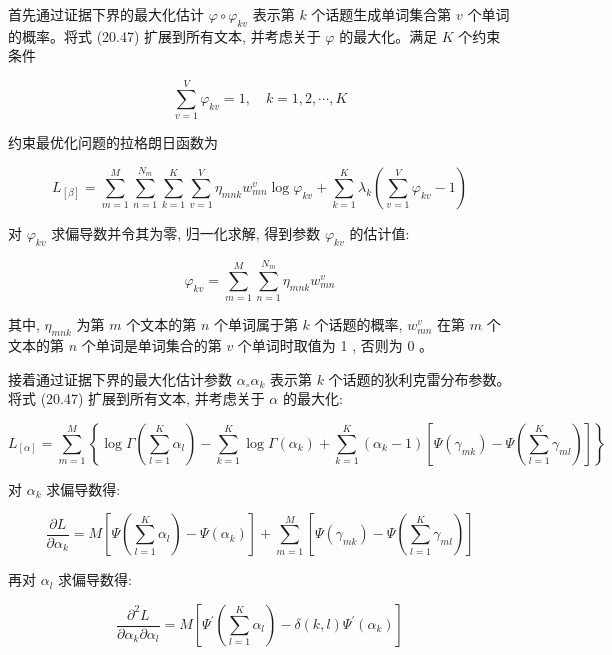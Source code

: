 \documentclass[10pt]{article}
\begin{document}
\begin{CJK*}{UTF8}{bsmi}
首先通过证据下界的最大化估计 $\varphi \circ \varphi_{k v}$ 表示第 $k$ 个话题生成单词集合第 $v$ 个单词的概率。将式 (20.47) 扩展到所有文本, 并考虑关于 $\varphi$ 的最大化。满足 $K$ 个约束条件

$$
\sum_{v=1}^{V} \varphi_{k v}=1, \quad k=1,2, \cdots, K
$$

约束最优化问题的拉格朗日函数为


\begin{equation*}
L_{[\beta]}=\sum_{m=1}^{M} \sum_{n=1}^{N_{m}} \sum_{k=1}^{K} \sum_{v=1}^{V} \eta_{m n k} w_{m n}^{v} \log \varphi_{k v}+\sum_{k=1}^{K} \lambda_{k}\left(\sum_{v=1}^{V} \varphi_{k v}-1\right) \tag{20.63}
\end{equation*}


对 $\varphi_{k v}$ 求偏导数并令其为零, 归一化求解, 得到参数 $\varphi_{k v}$ 的估计值:


\begin{equation*}
\varphi_{k v}=\sum_{m=1}^{M} \sum_{n=1}^{N_{m}} \eta_{m n k} w_{m n}^{v} \tag{20.64}
\end{equation*}


其中, $\eta_{m n k}$ 为第 $m$ 个文本的第 $n$ 个单词属于第 $k$ 个话题的概率, $w_{m n}^{v}$ 在第 $m$ 个文本的第 $n$ 个单词是单词集合的第 $v$ 个单词时取值为 1 , 否则为 0 。

接着通过证据下界的最大化估计参数 $\alpha_{\circ} \alpha_{k}$ 表示第 $k$ 个话题的狄利克雷分布参数。将式 (20.47) 扩展到所有文本, 并考虑关于 $\alpha$ 的最大化:


\begin{equation*}
L_{[\alpha]}=\sum_{m=1}^{M}\left\{\log \Gamma\left(\sum_{l=1}^{K} \alpha_{l}\right)-\sum_{k=1}^{K} \log \Gamma\left(\alpha_{k}\right)+\sum_{k=1}^{K}\left(\alpha_{k}-1\right)\left[\Psi\left(\gamma_{m k}\right)-\Psi\left(\sum_{l=1}^{K} \gamma_{m l}\right)\right]\right\} \tag{20.65}
\end{equation*}


对 $\alpha_{k}$ 求偏导数得:


\begin{equation*}
\frac{\partial L}{\partial \alpha_{k}}=M\left[\Psi\left(\sum_{l=1}^{K} \alpha_{l}\right)-\Psi\left(\alpha_{k}\right)\right]+\sum_{m=1}^{M}\left[\Psi\left(\gamma_{m k}\right)-\Psi\left(\sum_{l=1}^{K} \gamma_{m l}\right)\right] \tag{20.66}
\end{equation*}


再对 $\alpha_{l}$ 求偏导数得:


\begin{equation*}
\frac{\partial^{2} L}{\partial \alpha_{k} \partial \alpha_{l}}=M\left[\Psi^{\prime}\left(\sum_{l=1}^{K} \alpha_{l}\right)-\delta(k, l) \Psi^{\prime}\left(\alpha_{k}\right)\right] \tag{20.67}
\end{equation*}



\end{CJK*}
\end{document}
